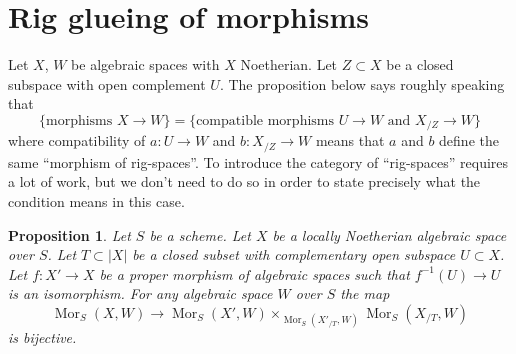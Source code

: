\documentclass{stacks-project}
\theoremstyle{plain}
\newtheorem{proposition}[subsection]{Proposition}
\theoremstyle{definition}
\theoremstyle{remark}
\numberwithin{equation}{subsection}
\def\Mor{\mathop{\mathrm{Mor}}\nolimits}
\begin{document}
\section{Rig glueing of morphisms}
\label{section-glue-formal-to-actual}

\noindent
Let $X$, $W$ be algebraic spaces with $X$ Noetherian. Let $Z \subset X$
be a closed subspace with open complement $U$.
The proposition below says roughly speaking that
$$
\{\text{morphisms }X \to W\} =
\{\text{compatible morphisms }U \to W\text{ and }X_{/Z} \to W\}
$$
where compatibility of $a : U \to W$ and $b : X_{/Z} \to W$
means that $a$ and $b$ define the same ``morphism of rig-spaces''.
To introduce the category of ``rig-spaces'' requires a lot of work, but
we don't need to do so in order to state precisely what the
condition means in this case.

\begin{proposition}
\label{proposition-glue-modification}
Let $S$ be a scheme. Let $X$ be a locally Noetherian algebraic space over $S$.
Let $T \subset |X|$ be a closed subset with complementary open subspace
$U \subset X$. Let $f : X' \to X$ be a proper morphism
of algebraic spaces such that $f^{-1}(U) \to U$ is an isomorphism.
For any algebraic space $W$ over $S$ the map
$$
\Mor_S(X, W) \longrightarrow
\Mor_S(X', W) \times_{\Mor_S(X'_{/T}, W)} \Mor_S(X_{/T}, W)
$$
is bijective.
\end{proposition}
\end{document}
